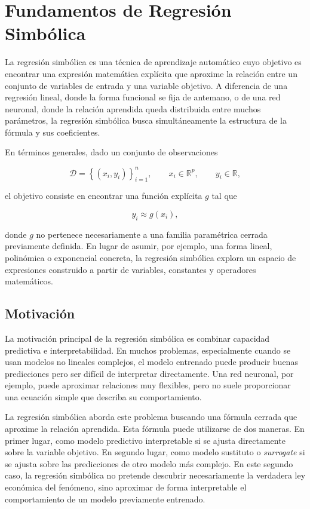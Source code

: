 
\chapter{Fundamentos de Regresión Simbólica}
\label{app:symbolic-regression}

La regresión simbólica es una técnica de aprendizaje automático cuyo objetivo es encontrar una expresión matemática explícita que aproxime la relación entre un conjunto de variables de entrada y una variable objetivo. A diferencia de una regresión lineal, donde la forma funcional se fija de antemano, o de una red neuronal, donde la relación aprendida queda distribuida entre muchos parámetros, la regresión simbólica busca simultáneamente la estructura de la fórmula y sus coeficientes.

En términos generales, dado un conjunto de observaciones

\begin{equation}
\mathcal{D}
=
\left\{
(x_i, y_i)
\right\}_{i=1}^{n},
\qquad
x_i \in \mathbb{R}^{p},
\qquad
y_i \in \mathbb{R},
\label{eq:symbolic-dataset}
\end{equation}

el objetivo consiste en encontrar una función explícita \(g\) tal que

\begin{equation}
y_i \approx g(x_i),
\label{eq:symbolic-approximation}
\end{equation}

donde \(g\) no pertenece necesariamente a una familia paramétrica cerrada previamente definida. En lugar de asumir, por ejemplo, una forma lineal, polinómica o exponencial concreta, la regresión simbólica explora un espacio de expresiones construido a partir de variables, constantes y operadores matemáticos.

\section{Motivación}

La motivación principal de la regresión simbólica es combinar capacidad predictiva e interpretabilidad. En muchos problemas, especialmente cuando se usan modelos no lineales complejos, el modelo entrenado puede producir buenas predicciones pero ser difícil de interpretar directamente. Una red neuronal, por ejemplo, puede aproximar relaciones muy flexibles, pero no suele proporcionar una ecuación simple que describa su comportamiento.

La regresión simbólica aborda este problema buscando una fórmula cerrada que aproxime la relación aprendida. Esta fórmula puede utilizarse de dos maneras. En primer lugar, como modelo predictivo interpretable si se ajusta directamente sobre la variable objetivo. En segundo lugar, como modelo sustituto o \emph{surrogate} si se ajusta sobre las predicciones de otro modelo más complejo. En este segundo caso, la regresión simbólica no pretende descubrir necesariamente la verdadera ley económica del fenómeno, sino aproximar de forma interpretable el comportamiento de un modelo previamente entrenado.

